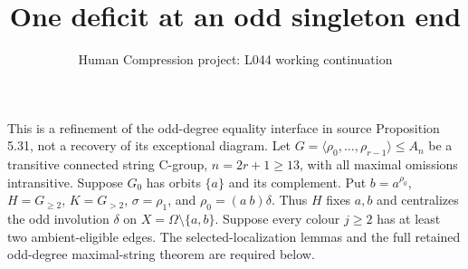 \documentclass[11pt,a4paper]{article}
\title{One deficit at an odd singleton end}
\author{Human Compression project: L044 working continuation}
\date{}
\newcommand{\gen}[1]{\langle#1\rangle}
\begin{document}
\maketitle
This is a refinement of the odd-degree equality interface in source
Proposition 5.31, not a recovery of its exceptional diagram.
Let $G=\gen{\rho_0,\ldots,\rho_{r-1}}\le A_n$ be a transitive
connected string C-group, $n=2r+1\ge13$, with all maximal omissions
intransitive. Suppose $G_0$ has orbits $\{a\}$ and its complement.
Put $b=a^{\rho_0}$, $H=G_{\ge2}$, $K=G_{>2}$,
$\sigma=\rho_1$, and $\rho_0=(a\ b)\delta$.
Thus $H$ fixes $a,b$ and centralizes the odd involution $\delta$
on $X=\Omega\setminus\{a,b\}$.
Suppose every colour $j\ge2$ has at least two ambient-eligible edges.
The selected-localization lemmas and the full retained odd-degree
maximal-string theorem are required below.
\end{document}
